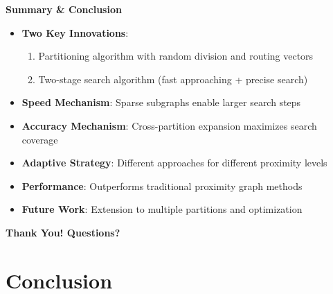 \begin{frame}
\begin{center}
\LARGE\textbf{Summary \& Conclusion}
\end{center}

\vspace{5mm}

\begin{itemize}
    \item \textbf{Two Key Innovations}:
    \begin{enumerate}
        \item Partitioning algorithm with random division and routing vectors
        \item Two-stage search algorithm (fast approaching + precise search)
    \end{enumerate}
    
    \item \textbf{Speed Mechanism}: Sparse subgraphs enable larger search steps
    
    \item \textbf{Accuracy Mechanism}: Cross-partition expansion maximizes search coverage
    
    \item \textbf{Adaptive Strategy}: Different approaches for different proximity levels
    
    \item \textbf{Performance}: Outperforms traditional proximity graph methods
    
    \item \textbf{Future Work}: Extension to multiple partitions and optimization
\end{itemize}

\vspace{5mm}
\begin{center}
\textbf{Thank You! Questions?}
\end{center}
\end{frame}%
\section{Conclusion}%
